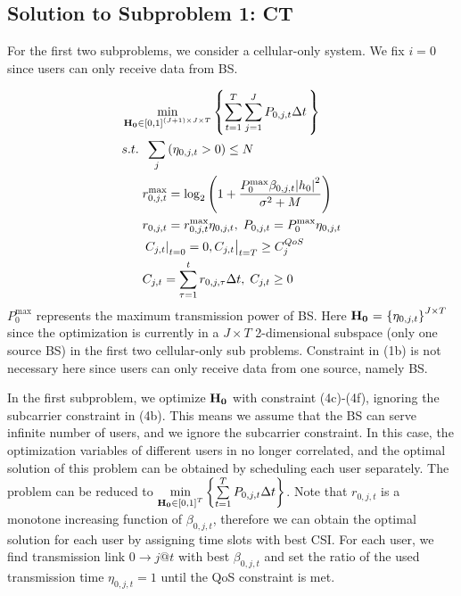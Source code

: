 \documentclass{ieeeaccess}
\begin{document}
\subsection{Solution to \textbf{Subproblem 1: CT}}

For the first two subproblems, we consider a cellular-only system. We fix $i = 0$ since users can only receive data from BS.

\begin{subequations}
\begin{align}
& \mathop {\min }\limits_{{\mathbf{{\rm H}}}_{\mathbf{0}} \in {{\left[ {0,1} \right]}^{\left( {J + 1} \right) \times J \times T}}} \left\{ {\sum\limits_{t = 1}^T {\sum\limits_{j = 1}^J {{P_{0,j,t}}\Delta t} \,} } \right\} \\
& {s.t.} \;\; \sum\limits_j  {\left( {{\eta _{0,j,t}} > 0} \right)}   \le N \\
& \;\;\;\;\;\; r_{0,j,t}^{\max } = {\log _2}\left( {1 + \frac{{P_0^{\max }{\beta _{0,j,t}}{{\left| {{h_0}} \right|}^2}}}{{{\sigma ^2} + M}}} \right) \\
& \;\;\;\;\;\; {r_{0,j,t}} = r_{0,j,t}^{\max }{\eta _{0,j,t}},\; {P_{0,j,t}} = P_0^{\max }{\eta _{0,j,t}} \\
& \;\;\;\;\;\; {\left. {{{\left. {{C_{j,t}}} \right|}_{t = 0}} = 0, {C_{j,t}}} \right|_{t = T}} \ge C_j^{QoS} \\
& \;\;\;\;\;\; {C_{j,t}} = \sum\limits_{\tau  = 1}^t {{r_{0,j,\tau }}\Delta t} ,\; {C_{j,t}} \ge 0
\end{align}
\end{subequations}
$P_0^{\max }$ represents the maximum transmission power of BS. Here ${{\mathbf{{\rm H}}}_{\mathbf{0}}}{\text{ = }}{\left\{ {{\eta _{0,j,t}}} \right\}^{J \times T}}$ since the optimization is currently in a $J \times T$ 2-dimensional subspace (only one source BS) in the first two cellular-only sub problems. Constraint in (1b) is not necessary here since users can only receive data from one source, namely BS.

In the first subproblem, we optimize ${{\mathbf{{\rm H}}}_{\mathbf{0}}}$ with constraint (4c)-(4f), ignoring the subcarrier constraint in (4b). This means we assume that the BS can serve infinite number of users, and we ignore the subcarrier constraint. In this case, the optimization variables of different users in no longer correlated, and the optimal solution of this problem can be obtained by scheduling each user separately. The problem can be reduced to $\mathop {\min }\limits_{{{\mathbf{{\rm H}}}_{\mathbf{0}}} \in {{\left[ {0,1} \right]}^T}} \left\{ {\sum\limits_{t = 1}^T {{P_{0,j,t}}\Delta t} } \right\}$. Note that ${r_{0,j,t}}$ is a monotone increasing function of ${\beta _{0,j,t}}$, therefore we can obtain the optimal solution for each user by assigning time slots with best CSI. For each user, we find transmission link $0 \to j@t$ with best ${\beta _{0,j,t}}$ and set the ratio of the used transmission time ${\eta _{0,j,t} = 1}$ until the QoS constraint is met.
\end{document}
